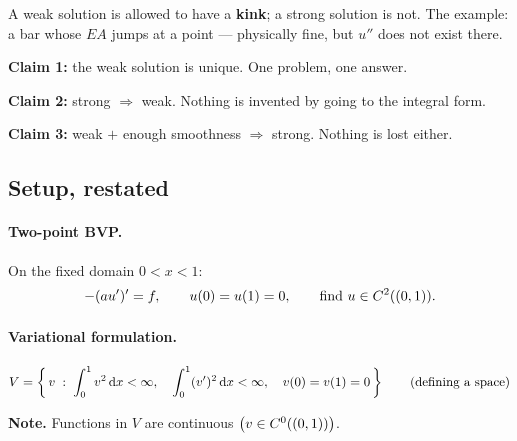 
\begin{roadmap}[Lecture 2]
\begin{roadlist}
\item A weak solution is allowed to have a \textbf{kink}; a strong solution is
  not. The example: a bar whose $EA$ jumps at a point --- physically fine, but
  $u''$ does not exist there.
\item \textbf{Claim 1:} the weak solution is unique. One problem, one answer.
\item \textbf{Claim 2:} strong $\Rightarrow$ weak. Nothing is invented by going
  to the integral form.
\item \textbf{Claim 3:} weak $+$ enough smoothness $\Rightarrow$ strong. Nothing
  is lost either.
\end{roadlist}
\end{roadmap}

\subsection*{Setup, restated}

\paragraph{Two-point BVP.} On the fixed domain $0<x<1$:
\begin{equation}\label{eq:bvp2}
  -(au')' = f,
  \qquad u(0)=u(1)=0,
  \qquad \text{find } u\in\Ck[(0,1)]{2}.
\end{equation}

\paragraph{Variational formulation.}
\begin{equation}\label{eq:Vdef2}
  V = \left\{\, v \;:\;
    \int_{0}^{1} v^{2}\dx < \infty,\quad
    \int_{0}^{1} (v')^{2}\dx < \infty,\quad
    v(0)=v(1)=0 \,\right\}
  \qquad\text{(defining a space)}
\end{equation}

\noindent\textbf{Note.} Functions in $V$ are continuous
$\bigl(v\in\Ck[(0,1)]{0}\bigr)$.

